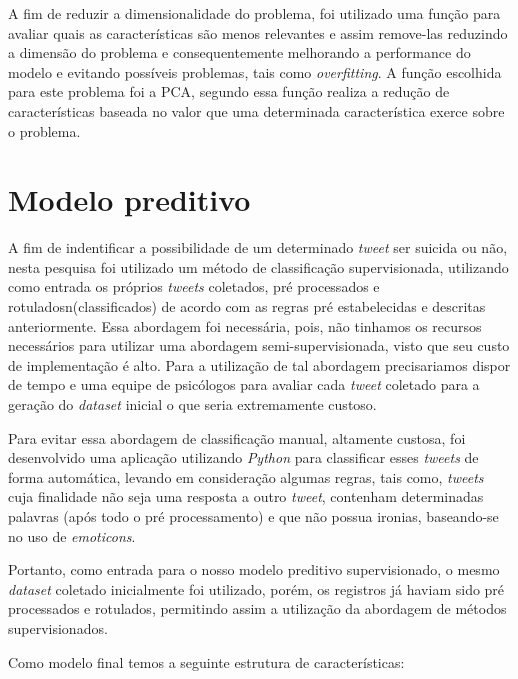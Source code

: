 A fim de reduzir a dimensionalidade do problema, foi utilizado uma função para avaliar quais as características são menos relevantes e assim remove-las reduzindo a dimensão do problema e consequentemente melhorando a performance do modelo e evitando possíveis problemas, tais como \textit{overfitting}. A função escolhida para este problema foi a PCA, segundo   essa função realiza a redução de características baseada no valor que uma determinada característica exerce sobre o problema.

\section{Modelo preditivo}

A fim de indentificar a possibilidade de um determinado \textit{tweet} ser suicida ou não, nesta pesquisa foi utilizado um método de classificação supervisionada, utilizando como entrada os próprios \textit{tweets} coletados, pré processados e rotuladosn(classificados) de acordo com as regras pré estabelecidas e descritas anteriormente. Essa abordagem foi necessária, pois, não tinhamos os recursos necessários para utilizar uma abordagem semi-supervisionada, visto que seu custo de implementação é alto. Para a utilização de tal abordagem precisariamos dispor de tempo e uma equipe de psicólogos para avaliar cada \textit{tweet} coletado para a geração do \textit{dataset} inicial o que seria extremamente custoso.

Para evitar essa abordagem de classificação manual, altamente custosa, foi desenvolvido uma aplicação utilizando \textit{Python} para classificar esses \textit{tweets} de forma automática, levando em consideração algumas regras, tais como, \textit{tweets} cuja finalidade não seja uma resposta a outro \textit{tweet}, contenham determinadas palavras (após todo o pré processamento) e que não possua ironias, baseando-se no uso de \textit{emoticons}.

Portanto, como entrada para o nosso modelo preditivo supervisionado, o mesmo \textit{dataset} coletado inicialmente foi utilizado, porém, os registros já haviam sido pré processados e rotulados, permitindo assim a utilização da abordagem de métodos supervisionados.

Como modelo final temos a seguinte estrutura de características:

